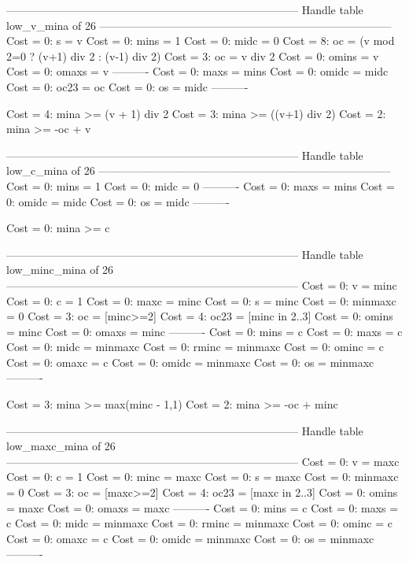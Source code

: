 --------------------------------------------------------------------------------
Handle table low_v_mina of 26
--------------------------------------------------------------------------------
Cost =  0:  s     = v
Cost =  0:  mins  = 1
Cost =  0:  midc  = 0
Cost =  8:  oc    = (v mod 2=0 ? (v+1) div 2 : (v-1) div 2)
Cost =  3:  oc    = v div 2
Cost =  0:  omins = v
Cost =  0:  omaxs = v
----------
Cost =  0:  maxs  = mins
Cost =  0:  omidc = midc
Cost =  0:  oc23  = oc
Cost =  0:  os    = midc
----------

Cost =  4:  mina >= (v + 1) div 2
Cost =  3:  mina >= ((v+1) div 2)
Cost =  2:  mina >= -oc + v

--------------------------------------------------------------------------------
Handle table low_c_mina of 26
--------------------------------------------------------------------------------
Cost =  0:  mins  = 1
Cost =  0:  midc  = 0
----------
Cost =  0:  maxs  = mins
Cost =  0:  omidc = midc
Cost =  0:  os    = midc
----------

Cost =  0:  mina >= c

--------------------------------------------------------------------------------
Handle table low_minc_mina of 26
--------------------------------------------------------------------------------
Cost =  0:  v       = minc
Cost =  0:  c       = 1
Cost =  0:  maxc    = minc
Cost =  0:  s       = minc
Cost =  0:  minmaxc = 0
Cost =  3:  oc      = [minc>=2]
Cost =  4:  oc23    = [minc in 2..3]
Cost =  0:  omins   = minc
Cost =  0:  omaxs   = minc
----------
Cost =  0:  mins    = c
Cost =  0:  maxs    = c
Cost =  0:  midc    = minmaxc
Cost =  0:  rminc   = minmaxc
Cost =  0:  ominc   = c
Cost =  0:  omaxc   = c
Cost =  0:  omidc   = minmaxc
Cost =  0:  os      = minmaxc
----------

Cost =  3:  mina >= max(minc - 1,1)
Cost =  2:  mina >= -oc + minc

--------------------------------------------------------------------------------
Handle table low_maxc_mina of 26
--------------------------------------------------------------------------------
Cost =  0:  v       = maxc
Cost =  0:  c       = 1
Cost =  0:  minc    = maxc
Cost =  0:  s       = maxc
Cost =  0:  minmaxc = 0
Cost =  3:  oc      = [maxc>=2]
Cost =  4:  oc23    = [maxc in 2..3]
Cost =  0:  omins   = maxc
Cost =  0:  omaxs   = maxc
----------
Cost =  0:  mins    = c
Cost =  0:  maxs    = c
Cost =  0:  midc    = minmaxc
Cost =  0:  rminc   = minmaxc
Cost =  0:  ominc   = c
Cost =  0:  omaxc   = c
Cost =  0:  omidc   = minmaxc
Cost =  0:  os      = minmaxc
----------

